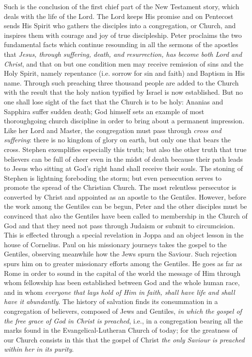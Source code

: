 Such is the conclusion of the first chief part of the New Testament story, which deals with the life of the Lord. The Lord keeps His promise and on Pentecost sends His Spirit who gathers the disciples into a congregation, or Church, and inspires them with courage and joy of true discipleship. Peter proclaims the two fundamental facts which continue resounding in all the sermons of the apostles that \emph{Jesus, through suffering, death, and resurrection, has become both Lord and Christ}, and that on but one condition men may receive remission of sins and the Holy Spirit, namely repentance (i.e. sorrow for sin and faith) and Baptism in His name. Through such preaching
three thousand people are added to the Church with the result that the holy nation typified by Israel is now established. But no one shall lose sight of the fact that the Church is to be holy: Ananias and Sapphira suffer sudden death; God himself sets an example of most thoroughgoing church discipline in order to bring about a permanent impression. Like her Lord and Master, the congregation must pass through \emph{cross and suffering}: there is no kingdom of glory on earth, but only one that bears the cross. Stephen exemplifies especially this truth; but also the other truth that true believers can be full of cheer even in the midst of death because their path leads to Jesus who sitting at God’s right hand shall receive their souls. The stoning of Stephen is lightning foreboding the storm; but even persecution serves to promote the spread of the Christian Church. The most relentless persecutor is converted by Christ and appointed as an apostle to the Gentiles. However, before the work among the Gentiles can be begun, Peter and the other disciples must be convinced that also the Gentiles have been called to membership in the Church of God and that they need not pass through Judaism or submit to circumcision. This is effected through a special revelation in Joppa and an object lesson in the house of Cornelius. Paul on his missionary journeys takes the gospel to the Gentiles, observing meanwhile how the Jews spurn the Saviour. Such rejection spurs him on to greater missionary efforts among the Gentiles. He goes as far as Rome in order to sound in the capital of the world the message of Him through whom fellowship has been established between God and the whole human race, and in whom \emph{everyone that lays hold of Him in faith, shall have life and shall have it abundantly}. The history of salvation finds its consummation in a congregation of believers, composed of Jews and Gentiles, \emph{in which the gospel of the free grace of God in Christ is preached}, i.e., in a congregation bearing all the marks found in the Evangelical-Lutheran Church of today; for the greatness of our Church consists in this that the gospel of Christ \emph{the only Saviour is preached within her in its purity}.


